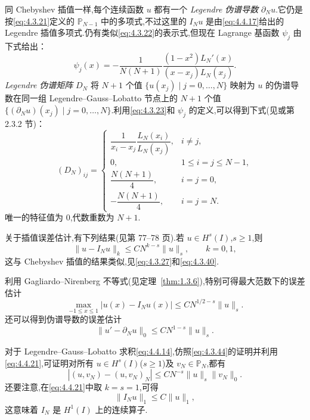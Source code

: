 同 Chebyshev 插值一样,每个连续函数 \(u\) 都有一个 \emph{Legendre 伪谱导数} \(\partial_Nu\).它仍是按\eqref{eq:4.3.21}定义的 \(\mathbb P_{N-1}\) 中的多项式,不过这里的 \(I_Nu\) 是由\eqref{eq:4.4.17}给出的 Legendre 插值多项式.仍有类似\eqref{eq:4.3.22}的表示式,但现在 Lagrange 基函数 \(\psi_j\) 由下式给出：
\[
  \psi_j(x)=-\frac{1}{N(N+1)}
       \frac{(1-x^2)L_N'(x)}{(x-x_j)L_N(x_j)}.
\]
\emph{Legendre 伪谱矩阵} \(D_N\) 将 \(N+1\) 个值 \(\{u(x_j)\mid j=0,\ldots,N\}\) 映射为 \(u\) 的伪谱导数在同一组 Legendre--Gauss--Lobatto 节点上的 \(N+1\) 个值 \(\{(\partial_Nu)(x_j)\mid j=0,\ldots,N\}\).利用\eqref{eq:4.3.23}和 \(\psi_j\) 的定义,可以得到下式(见或第 2.3.2 节)：
\begin{equation}\label{eq:4.4.20}
  (D_N)_{ij}=
  \begin{cases}
    \dfrac1{x_i-x_j}\dfrac{L_N(x_i)}{L_N(x_j)},&i\ne j,\\[3pt]
    0,&1\le i=j\le N-1,\\[3pt]
    \dfrac{N(N+1)}4,&i=j=0,\\[3pt]
    -\dfrac{N(N+1)}4,&i=j=N.
  \end{cases}
\end{equation}
唯一的特征值为 \(0\),代数重数为 \(N+1\).

关于插值误差估计,有下列结果(见第 77–78 页).若 \(u\in H^s(I)\),\(s\ge1\),则
\begin{equation}\label{eq:4.4.21}
  \|u-I_Nu\|_k\le CN^{k-s}\|u\|_s,\qquad k=0,1,
\end{equation}
这与 Chebyshev 插值的结果类似,见\eqref{eq:4.3.27}和\eqref{eq:4.3.40}.

利用 Gagliardo--Nirenberg 不等式(见定理~\ref{thm:1.3.6}),特别可得最大范数下的误差估计
\begin{equation}\label{eq:4.4.22}
  \max_{-1\le x\le1}|u(x)-I_Nu(x)|\le CN^{1/2-s}\|u\|_s.
\end{equation}
还可以得到伪谱导数的误差估计
\begin{equation}\label{eq:4.4.23}
  \|u'-\partial_Nu\|_0\le CN^{1-s}\|u\|_s.
\end{equation}

对于 Legendre--Gauss--Lobatto 求积\eqref{eq:4.4.14},仿照\eqref{eq:4.3.44}的证明并利用\eqref{eq:4.4.21},可证明对所有 \(u\in H^s(I)\)(\(s\ge1\))及 \(v_N\in\mathbb P_N\),都有
\begin{equation}\label{eq:4.4.24}
  |(u,v_N)-(u,v_N)_N|\le CN^{-s}\|u\|_s\|v_N\|_0.
\end{equation}
还要注意,在\eqref{eq:4.4.21}中取 \(k=s=1\),可得
\begin{equation}\label{eq:4.4.25}
  \|I_Nu\|_1\le C\|u\|_1,
\end{equation}
这意味着 \(I_N\) 是 \(H^1(I)\) 上的连续算子.

